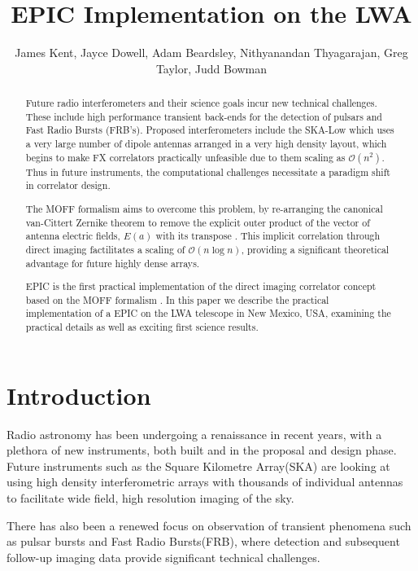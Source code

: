 \documentclass[bibliography=totocnumbered, twocolumn]{article}
\title{EPIC Implementation on the LWA}
\author{James Kent, Jayce Dowell, Adam Beardsley, Nithyanandan Thyagarajan, Greg Taylor, Judd Bowman}
\begin{document}
\maketitle
\begin{abstract}

  Future radio interferometers and their science goals incur new technical
  challenges. These include high performance transient back-ends
  for the detection of pulsars and Fast Radio Bursts (FRB's). Proposed
  interferometers include the SKA-Low which uses a very large number of dipole
  antennas arranged in a very high density layout, which begins to make FX
  correlators practically unfeasible due to them scaling as $\mathcal{O}(n^2)$.
  Thus in future instruments, the computational challenges necessitate a
  paradigm shift in correlator design.

  The MOFF formalism aims to overcome this problem, by re-arranging the canonical
  van-Cittert Zernike theorem to remove the explicit outer product of the vector of
  antenna electric fields, $E(a)$ with its transpose \citep{morales_enabling_2011}.
  This implicit correlation through direct imaging factilitates a scaling of
  $\mathcal{O}(n\log{n})$, providing a significant theoretical advantage for
  future highly dense arrays.

  EPIC is the first practical implementation of the direct imaging correlator
  concept based on the MOFF formalism \citep{thyagarajan_generic_2017}. In this
  paper we describe the practical implementation of a EPIC on the LWA telescope
  in New Mexico, USA, examining the practical details as well as exciting first
  science results.  
\end{abstract}


\section{Introduction}

Radio astronomy has been undergoing a renaissance in recent years,
with a plethora of new instruments, both built and in the proposal
and design phase. Future  instruments such as the Square Kilometre
Array(SKA) are looking at using high density interferometric arrays
with thousands of individual antennas to facilitate wide field,
high resolution imaging of the sky.

There has also been a renewed focus on observation of transient
phenomena such as pulsar bursts and Fast Radio Bursts(FRB), where
detection and subsequent follow-up imaging data provide significant
technical challenges.
\end{document}
